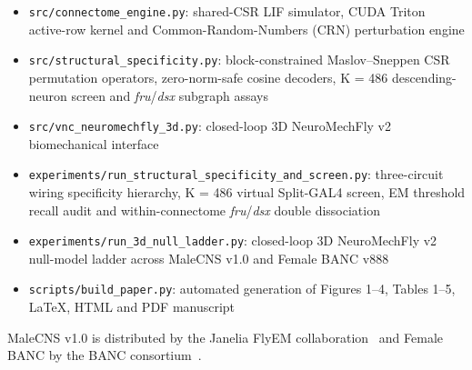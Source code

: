 \documentclass[11pt,a4paper]{article}
\begin{document}
\begin{itemize}
  \item \texttt{src/connectome\_engine.py}: shared-CSR LIF simulator, CUDA Triton active-row kernel and Common-Random-Numbers (CRN) perturbation engine
  \item \texttt{src/structural\_specificity.py}: block-constrained Maslov--Sneppen CSR permutation operators, zero-norm-safe cosine decoders, K = 486 descending-neuron screen and \emph{fru}/\emph{dsx} subgraph assays
  \item \texttt{src/vnc\_neuromechfly\_3d.py}: closed-loop 3D NeuroMechFly v2 biomechanical interface
  \item \texttt{experiments/run\_structural\_specificity\_and\_screen.py}: three-circuit wiring specificity hierarchy, K = 486 virtual Split-GAL4 screen, EM threshold recall audit and within-connectome \emph{fru}/\emph{dsx} double dissociation
  \item \texttt{experiments/run\_3d\_null\_ladder.py}: closed-loop 3D NeuroMechFly v2 null-model ladder across MaleCNS v1.0 and Female BANC v888
  \item \texttt{scripts/build\_paper.py}: automated generation of Figures 1--4, Tables 1--5, LaTeX, HTML and PDF manuscript
\end{itemize}
MaleCNS v1.0 is distributed by the Janelia FlyEM collaboration~\cite{berg2026sexual} and Female BANC by the BANC consortium~\cite{bates2025banc}.



\end{document}
